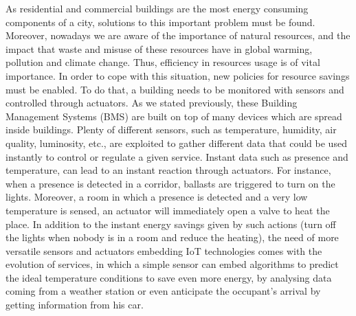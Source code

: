 As residential and commercial buildings are the most energy consuming components \cite{perez2008review} of a city, solutions to this important problem must be found.
Moreover, nowadays we are aware of the importance of natural resources, and the impact that waste and misuse of these resources have in global warming, pollution and climate change.
Thus, efficiency in resources usage is of vital importance.
In order to cope with this situation, new policies for resource savings must be enabled.
To do that, a building needs to be monitored with sensors and controlled through actuators.
As we stated previously, these Building Management Systems (BMS) are built on top of many devices which are spread inside buildings.
Plenty of different sensors, such as temperature, humidity, air quality, luminosity, etc., are exploited to gather different data that could be used instantly to control or regulate a given service.
Instant data such as presence and temperature, can lead to an instant reaction through actuators.
For instance, when a presence is detected in a corridor, ballasts are triggered to turn on the lights.
Moreover, a room in which a presence is detected and a very low temperature is sensed, an actuator will immediately open a valve to heat the place.
In addition to the instant energy savings given by such actions (turn off the lights when nobody is in a room and reduce the heating), the need of more versatile sensors and actuators embedding IoT technologies comes with the evolution of services, in which a simple sensor can embed algorithms to predict the ideal temperature conditions to save even more energy, by analysing data coming from a weather station or even anticipate the occupant's arrival by getting information from his car.

